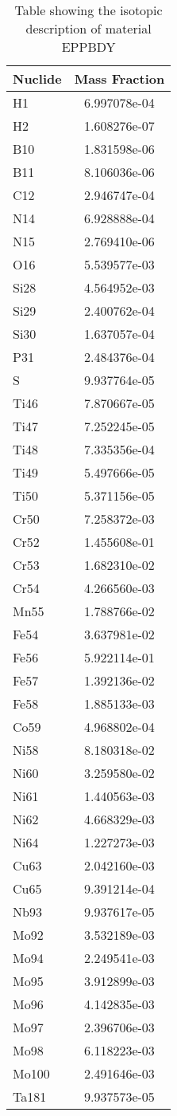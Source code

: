 \begin{centering}
\begin{table}[ht!]
\begin{tabular}{l | c}
\hline
Nuclide & Mass Fraction\\
\hline
H1 & 6.997078e-04\\
H2 & 1.608276e-07\\
B10 & 1.831598e-06\\
B11 & 8.106036e-06\\
C12 & 2.946747e-04\\
N14 & 6.928888e-04\\
N15 & 2.769410e-06\\
O16 & 5.539577e-03\\
Si28 & 4.564952e-03\\
Si29 & 2.400762e-04\\
Si30 & 1.637057e-04\\
P31 & 2.484376e-04\\
S & 9.937764e-05\\
Ti46 & 7.870667e-05\\
Ti47 & 7.252245e-05\\
Ti48 & 7.335356e-04\\
Ti49 & 5.497666e-05\\
Ti50 & 5.371156e-05\\
Cr50 & 7.258372e-03\\
Cr52 & 1.455608e-01\\
Cr53 & 1.682310e-02\\
Cr54 & 4.266560e-03\\
Mn55 & 1.788766e-02\\
Fe54 & 3.637981e-02\\
Fe56 & 5.922114e-01\\
Fe57 & 1.392136e-02\\
Fe58 & 1.885133e-03\\
Co59 & 4.968802e-04\\
Ni58 & 8.180318e-02\\
Ni60 & 3.259580e-02\\
Ni61 & 1.440563e-03\\
Ni62 & 4.668329e-03\\
Ni64 & 1.227273e-03\\
Cu63 & 2.042160e-03\\
Cu65 & 9.391214e-04\\
Nb93 & 9.937617e-05\\
Mo92 & 3.532189e-03\\
Mo94 & 2.249541e-03\\
Mo95 & 3.912899e-03\\
Mo96 & 4.142835e-03\\
Mo97 & 2.396706e-03\\
Mo98 & 6.118223e-03\\
Mo100 & 2.491646e-03\\
Ta181 & 9.937573e-05
\end{tabular}
\caption{Table showing the isotopic description of material EPPBDY}
\label{table:material_EPPBDY}
\end{table}\clearpage


\end{centering}

